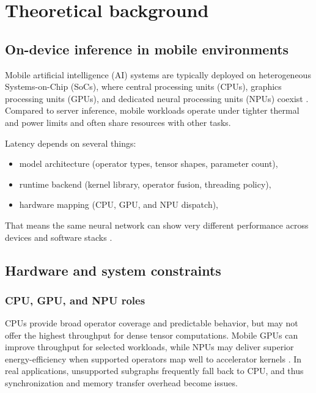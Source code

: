 \chapter{Theoretical background}

\section{On-device inference in mobile environments}

Mobile artificial intelligence (AI) systems are typically deployed on heterogeneous Systems-on-Chip
(SoCs), where central processing units (CPUs), graphics processing units (GPUs), and dedicated neural processing units (NPUs) coexist
\cite{lee2019mobilegpu,wang2020mobilesoc}. Compared to server inference,
mobile workloads operate under tighter thermal and power limits and often share
resources with other tasks.

Latency depends on several things:
\begin{itemize}
    \item model architecture (operator types, tensor shapes, parameter count),
    \item runtime backend (kernel library, operator fusion, threading policy),
    \item hardware mapping (CPU, GPU, and NPU dispatch),
\end{itemize}

That means the same neural network can show very different
performance across devices and software stacks
\cite{li2024mobilebenchmark,reddi2022mlperfmobile}.

\section{Hardware and system constraints}

\subsection{CPU, GPU, and NPU roles}

CPUs provide broad operator coverage and predictable behavior, but may not offer
the highest throughput for dense tensor computations. Mobile GPUs can improve
throughput for selected workloads, while NPUs may deliver superior
energy-efficiency when supported operators map well to accelerator kernels
\cite{lee2019mobilegpu,wang2020mobilesoc}. In real applications, unsupported
subgraphs frequently fall back to CPU, and thus synchronization and memory
transfer overhead become issues.

